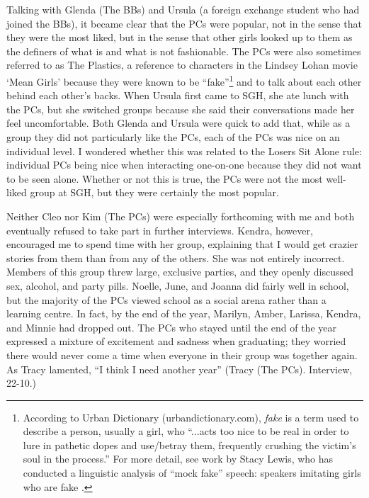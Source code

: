 Talking with Glenda (The BBs) and Ursula (a foreign exchange student who had joined the BBs), it became clear that the PCs were popular, not in the sense that they were the most liked, but in the sense that other girls looked up to them as the definers of what is and what is not fashionable.  The PCs were also sometimes referred to as The Plastics, a reference to characters in the Lindsey Lohan movie `Mean Girls' because they were known to be ``fake''\footnote{According to Urban Dictionary (urbandictionary.com), \textit{fake} is a term used to describe a person, usually a girl, who ``...acts too nice to be real in order to lure in pathetic dopes and use/betray them, frequently crushing the victim's soul in the process.''  For more detail, see work by Stacy Lewis, who has conducted a linguistic analysis of ``mock fake'' speech: speakers imitating girls who are fake \cite{lewis2007}.} and to talk about each other behind each other's backs.  When Ursula first came to SGH, she ate lunch with the PCs, but she switched groups because she said their conversations made her feel uncomfortable.  Both Glenda and Ursula were quick to add that, while as a group they did not particularly like the PCs, each of the PCs was nice on an individual level.  I wondered whether this was related to the Losers Sit Alone rule: individual PCs being nice when interacting one-on-one because they did not want to be seen alone.  Whether or not this is true, the PCs were not the most well-liked group at SGH, but they were certainly the most popular.


Neither Cleo nor Kim (The PCs) were especially forthcoming with me and both eventually refused to take part in further interviews.  Kendra, however, encouraged me to spend time with her group, explaining that I would get crazier stories from them than from any of the others.  She was not entirely incorrect.  Members of this group threw large, exclusive parties, and they openly discussed sex, alcohol, and party pills.  Noelle, June, and Joanna did fairly well in school, but the majority of the PCs viewed school as a social arena rather than a learning centre.  In fact, by the end of the year, Marilyn, Amber, Larissa, Kendra, and Minnie had dropped out.  The PCs who stayed until the end of the year expressed a mixture of excitement and sadness when graduating; they worried there would never come a time when everyone in their group was together again.  As Tracy lamented, ``I think I need another year'' (Tracy (The PCs). Interview, 22-10.)




